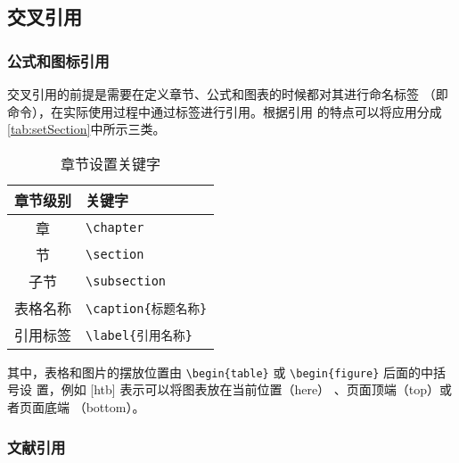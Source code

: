 \subsection{交叉引用}

\subsubsection{公式和图标引用}

交叉引用的前提是需要在定义章节、公式和图表的时候都对其进行命名标签
（即\label{sec:labelName} 命令），在实际使用过程中通过标签进行引用。根据引用
的特点可以将应用分成\autoref{tab:setSection}中所示三类。

\begin{table}[htb]
 \centering
  \caption{章节设置关键字}     %
  \label{tab:setSection}    %
  \begin{tabular}{cl}
    \hline
    章节级别        & 关键字     \\
    \hline
     章        & \verb|\chapter| \\
     节        & \verb|\section | \\
    子节      & \verb|\subsection |\\
    表格名称       & \verb|\caption{标题名称}| \\
    引用标签       & \verb|\label{引用名称}| \\
    \hline
  \end{tabular}
\end{table}


其中，表格和图片的摆放位置由 \verb|\begin{table}| 或 \verb|\begin{figure}| 后面的中括号设
置，例如 [htb] 表示可以将图表放在当前位置（here）
、页面顶端（top）或者页面底端
（bottom）。

\subsubsection{文献引用}

